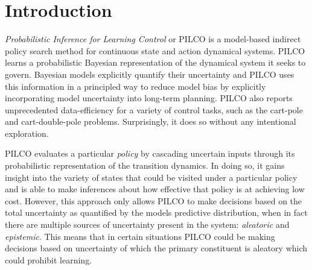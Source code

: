
\chapter{Introduction}  %

\ifpdf
    \graphicspath{{Chapter1/Figs/Raster/}{Chapter1/Figs/PDF/}{Chapter1/Figs/}}
\else
    \graphicspath{{Chapter1/Figs/Vector/}{Chapter1/Figs/}{Chapter1/Figures/}}
\fi


\textit{Probabilistic Inference for Learning  Control} or PILCO \citep{deisenroth2011pilco} is a model-based indirect policy search method for continuous state and action dynamical systems. PILCO learns a probabilistic Bayesian representation of the dynamical system it seeks to govern. Bayesian models explicitly quantify their uncertainty and PILCO uses this information in a principled way to reduce model bias by explicitly incorporating model uncertainty into long-term planning. PILCO also reports unprecedented data-efficiency for a variety of control tasks, such as the cart-pole and cart-double-pole problems. Surprisingly, it does so without any intentional exploration.

PILCO evaluates a particular \textit{policy} by cascading uncertain inputs through its probabilistic representation of the transition dynamics. In doing so, it gains insight into the variety of states that could be visited under a particular policy and is able to make inferences about how effective that policy is at achieving low cost. However, this approach only allows PILCO to make decisions based on the total uncertainty as quantified by the models predictive distribution, when in fact there are multiple sources of uncertainty present in the system: \textit{aleatoric} and \textit{epistemic}. This means that in certain situations PILCO could be making decisions based on uncertainty of which the primary constituent is aleatory which could prohibit learning.

